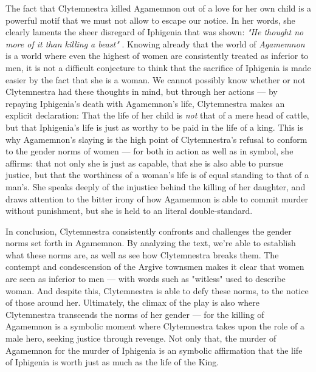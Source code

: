 \noindent
The fact that Clytemnestra killed Agamemnon out of a love for her own child is
a powerful motif that we must not allow to escape our notice. In her words, she
clearly laments the sheer disregard of Iphigenia that was shown: \emph{"He
thought no more of it than killing a beast"} \autocite[1440]{fagles}. Knowing
already that the world of \emph{Agamemnon} is a world where even the highest of
women are consistently treated as inferior to men, it is not a difficult
conjecture to think that the sacrifice of Iphigenia is made easier by the
fact that she is a woman. We cannot possibly know whether or not Clytemnestra
had these thoughts in mind, but through her actions --- by
repaying Iphigenia's death with Agamemnon's life, Clytemnestra makes an explicit
declaration: That the life of her child is \emph{not} that of a mere head of
cattle, but that Iphigenia's life is just as worthy to be paid in the life of a
king. This is why Agamemnon's slaying is the high point of Clytemnestra's
refusal to conform to the gender norms of women --- for both in action as well
as in symbol, she affirms: that not only she is just as capable, that she is
also able to pursue justice, but that the worthiness of a woman's life is of
equal standing to that of a man's. She speaks deeply of the injustice behind
the killing of her daughter, and draws attention to the bitter irony of how
Agamemnon is able to commit murder without punishment, but she is held to an
literal double-standard.

In conclusion, Clytemnestra consistently confronts and challenges the gender
norms set forth in Agamemnon. By analyzing the text, we're able to establish
what these norms are, as well as see how Clytemnestra breaks them. The contempt
and condescension of the Argive townsmen makes it clear that women are seen as
inferior to men --- with words such as "witless" used to describe woman. And
despite this, Clytemnestra is able to defy these norms, to the notice of those
around her. Ultimately, the climax of the play is also where Clytemnestra
transcends the norms of her gender --- for the killing of Agamemnon is a
symbolic moment where Clytemnestra takes upon the role of a male hero,
seeking justice through revenge. Not only that, the murder of Agamemnon for the
murder of Iphigenia is an symbolic affirmation that the life of Iphigenia is
worth just as much as the life of the King.

\noindent
